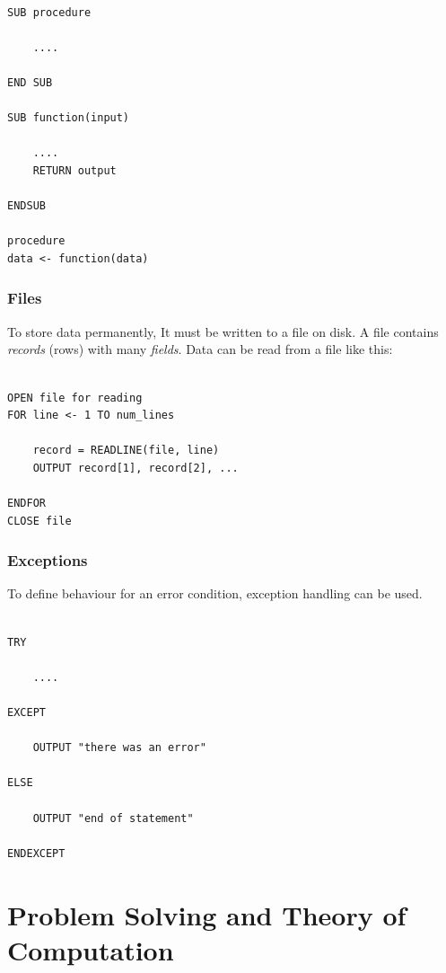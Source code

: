 \documentclass[9pt]{article}
\let\oldsection\section
\renewcommand\section{\clearpage\oldsection}
\begin{document}
\begin{verbatim}

SUB procedure

    ....

END SUB

SUB function(input)

    ....
    RETURN output

ENDSUB

procedure
data <- function(data)

\end{verbatim}

\subsubsection{Files}
\label{sec:org3be3862}

To store data permanently, It must be written to a file on disk. A file contains \emph{records} (rows) with many \emph{fields}. Data can be read from a file like this:

\begin{verbatim}

OPEN file for reading
FOR line <- 1 TO num_lines

    record = READLINE(file, line)
    OUTPUT record[1], record[2], ...

ENDFOR
CLOSE file

\end{verbatim}

\subsubsection{Exceptions}
\label{sec:orga6c857d}

To define behaviour for an error condition, exception handling can be used.

\begin{verbatim}

TRY

    ....

EXCEPT

    OUTPUT "there was an error"

ELSE

    OUTPUT "end of statement"

ENDEXCEPT

\end{verbatim}

\section{Problem Solving and Theory of Computation}
\label{sec:orgb191d95}
\end{document}
